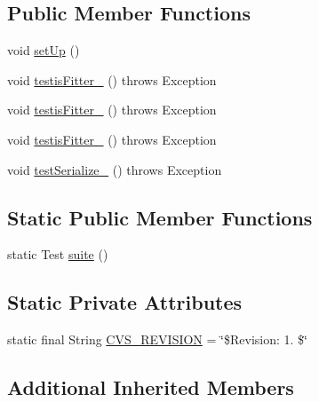 \subsection*{Public Member Functions}
\begin{DoxyCompactItemize}
\item 
void \hyperlink{classorg_1_1jgap_1_1gp_1_1impl_1_1_default_g_p_fitness_evaluator_test_a502c295353ef1b919cf0f91ffb0eb3ce}{set\-Up} ()
\item 
void \hyperlink{classorg_1_1jgap_1_1gp_1_1impl_1_1_default_g_p_fitness_evaluator_test_a37fd91f02c43d31e536d06ec570fd4d6}{testis\-Fitter\-\_} ()  throws Exception 
\item 
void \hyperlink{classorg_1_1jgap_1_1gp_1_1impl_1_1_default_g_p_fitness_evaluator_test_adc21609590b2043c011c44f255cd62f0}{testis\-Fitter\-\_} ()  throws Exception 
\item 
void \hyperlink{classorg_1_1jgap_1_1gp_1_1impl_1_1_default_g_p_fitness_evaluator_test_afdcec011f7923bfb5ebb3eb1450f8938}{testis\-Fitter\-\_} ()  throws Exception 
\item 
void \hyperlink{classorg_1_1jgap_1_1gp_1_1impl_1_1_default_g_p_fitness_evaluator_test_ad4ed251000671010ee462fbaf8856370}{test\-Serialize\-\_} ()  throws Exception 
\end{DoxyCompactItemize}
\subsection*{Static Public Member Functions}
\begin{DoxyCompactItemize}
\item 
static Test \hyperlink{classorg_1_1jgap_1_1gp_1_1impl_1_1_default_g_p_fitness_evaluator_test_adc05498c8e2b0a3da485e2f9da17cefd}{suite} ()
\end{DoxyCompactItemize}
\subsection*{Static Private Attributes}
\begin{DoxyCompactItemize}
\item 
static final String \hyperlink{classorg_1_1jgap_1_1gp_1_1impl_1_1_default_g_p_fitness_evaluator_test_a1130b21d99d20ea333b312dd8a6b75c7}{C\-V\-S\-\_\-\-R\-E\-V\-I\-S\-I\-O\-N} = \char`\"{}\$Revision\-: 1. \$\char`\"{}
\end{DoxyCompactItemize}
\subsection*{Additional Inherited Members}


